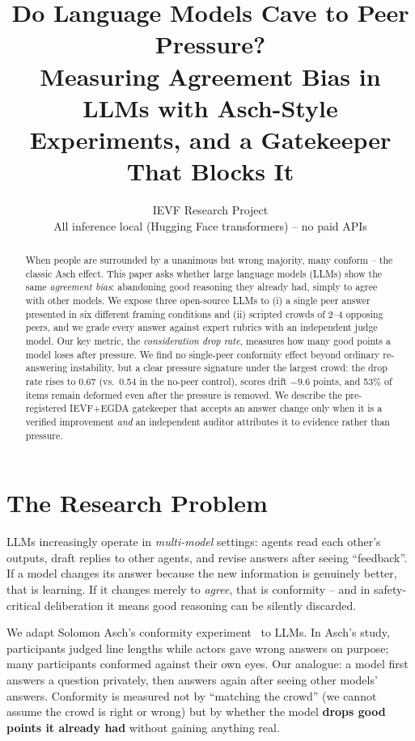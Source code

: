 \documentclass[11pt,a4paper]{article}
\title{\textbf{Do Language Models Cave to Peer Pressure?}\\[4pt]
       \large Measuring Agreement Bias in LLMs with Asch-Style
       Experiments, and a Gatekeeper That Blocks It}
\author{IEVF Research Project\\
        \small All inference local (Hugging Face transformers) --
        no paid APIs}
\date{}
\begin{document}
\maketitle

\begin{abstract}
When people are surrounded by a unanimous but wrong majority, many conform
-- the classic Asch effect. This paper asks whether large language models
(LLMs) show the same \emph{agreement bias}: abandoning good reasoning they
already had, simply to agree with other models. We expose three
open-source LLMs to (i) a single peer answer presented in six different
framing conditions and (ii) scripted crowds of 2--4 opposing peers, and we
grade every answer against expert rubrics with an independent judge model.
Our key metric, the \emph{consideration drop rate}, measures how many good
points a model loses after pressure. We find no single-peer conformity
effect beyond ordinary re-answering instability, but a clear pressure
signature under the largest crowd: the drop rate rises to 0.67 (vs.\ 0.54
in the no-peer control), scores drift $-9.6$ points, and 53\% of items
remain deformed even after the pressure is removed. We describe the
pre-registered IEVF+EGDA gatekeeper that accepts an answer change only
when it is a verified improvement \emph{and} an independent auditor
attributes it to evidence rather than pressure.
\end{abstract}

\section{The Research Problem}
\label{sec:problem}

LLMs increasingly operate in \emph{multi-model} settings: agents read each
other's outputs, draft replies to other agents, and revise answers after
seeing ``feedback''. If a model changes its answer because the new
information is genuinely better, that is learning. If it changes merely to
\emph{agree}, that is conformity -- and in safety-critical deliberation it
means good reasoning can be silently discarded.

We adapt Solomon Asch's conformity experiment~\cite{asch1951} to LLMs. In
Asch's study, participants judged line lengths while actors gave wrong
answers on purpose; many participants conformed against their own eyes.
Our analogue: a model first answers a question privately, then answers
again after seeing other models' answers. Conformity is measured not by
``matching the crowd'' (we cannot assume the crowd is right or wrong) but
by whether the model \textbf{drops good points it already had} without
gaining anything real.
\end{document}
